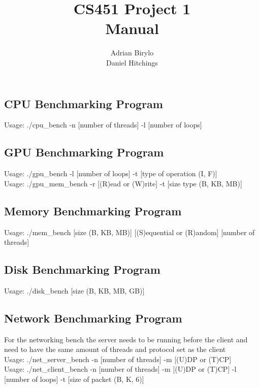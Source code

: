 \documentclass{article}
\title{CS451 Project 1 \\ Manual}
\author{Adrian Birylo \\ Daniel Hitchings}
\begin{document}
\maketitle
\bigskip 

\subsection{CPU Benchmarking Program}
Usage: ./cpu\_bench -n [number of threads] -l [number of loops]

\subsection{GPU Benchmarking Program}
Usage: ./gpu\_bench -l [number of loops] -t [type of operation (I, F)]\\
Usage: ./gpu\_mem\_bench -r [(R)ead or (W)rite] -t [size type (B, KB, MB)]
\subsection{Memory Benchmarking Program}
Usage: ./mem\_bench [size (B, KB, MB)] [(S)equential or (R)andom] [number of threads]

\subsection{Disk Benchmarking Program}
Usage: ./disk\_bench [size (B, KB, MB, GB)]

\subsection{Network Benchmarking Program}
For the networking bench the server needs to be running before the client and need to have the same amount of threads and protocol set as the client \\
Usage: ./net\_server\_bench -n [number of threads] -m [(U)DP or (T)CP]\\
Usage: ./net\_client\_bench -n [number of threads] -m [(U)DP or (T)CP] -l [number of loops] -t [size of packet (B, K, 6)]
\end{document}
